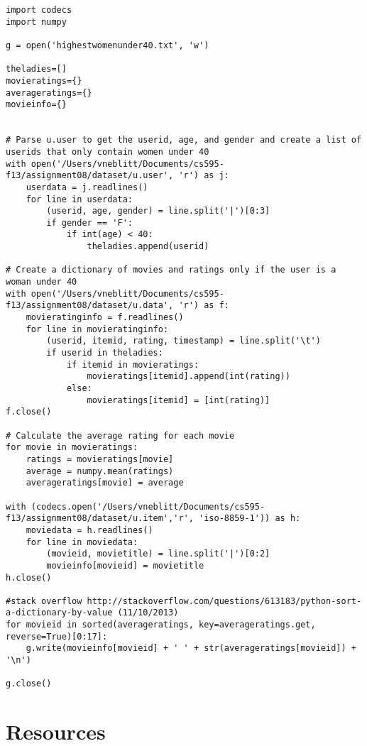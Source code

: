 \documentclass{article}
\begin{document}
\begin{lstlisting}[frame=single, caption=highestwomenunder40.py, label=highwomenunder40]
import codecs
import numpy

g = open('highestwomenunder40.txt', 'w')

theladies=[]
movieratings={}
averageratings={}
movieinfo={}


# Parse u.user to get the userid, age, and gender and create a list of userids that only contain women under 40
with open('/Users/vneblitt/Documents/cs595-f13/assignment08/dataset/u.user', 'r') as j:
	userdata = j.readlines()
	for line in userdata:
		(userid, age, gender) = line.split('|')[0:3]
		if gender == 'F':
			if int(age) < 40:
				theladies.append(userid)

# Create a dictionary of movies and ratings only if the user is a woman under 40
with open('/Users/vneblitt/Documents/cs595-f13/assignment08/dataset/u.data', 'r') as f:
	movieratinginfo = f.readlines()
	for line in movieratinginfo:
		(userid, itemid, rating, timestamp) = line.split('\t')
		if userid in theladies:
			if itemid in movieratings:
				movieratings[itemid].append(int(rating))
			else:
				movieratings[itemid] = [int(rating)]
f.close()

# Calculate the average rating for each movie
for movie in movieratings:
	ratings = movieratings[movie]
	average = numpy.mean(ratings)
	averageratings[movie] = average

with (codecs.open('/Users/vneblitt/Documents/cs595-f13/assignment08/dataset/u.item','r', 'iso-8859-1')) as h:
	moviedata = h.readlines()
	for line in moviedata:
		(movieid, movietitle) = line.split('|')[0:2]
		movieinfo[movieid] = movietitle
h.close()

#stack overflow http://stackoverflow.com/questions/613183/python-sort-a-dictionary-by-value (11/10/2013)
for movieid in sorted(averageratings, key=averageratings.get, reverse=True)[0:17]:
	g.write(movieinfo[movieid] + ' ' + str(averageratings[movieid]) + '\n')

g.close()
\end{lstlisting}

\newpage

\section*{Resources}
\end{document}

